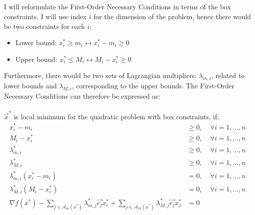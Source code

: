 \documentclass[a4paper]{article}
\begin{document}
\subsection{}
I will reformulate the First-Order Necessary Conditions in terms of the box
constraints. I will use index $i$ for the dimension of the problem, hence there
would be two constraints for each $i$:
\begin{itemize}
\item Lower bound: $x_i^* \geq m_i \leftrightarrow x_i^* - m_i \geq 0 $
\item Upper bound: $x_i^* \leq M_i \leftrightarrow M_i - x_i^*\geq 0 $
\end{itemize}
Furthermore, there would be two sets of Lagrangian multipliers: $\lambda_{m,i}$,
related to lower bounds and $\lambda_{M,i}$, corresponding to
the upper bounds. The First-Order Necessary Conditions can therefore be
expressed as: \\\\
$\vec{x}^{*}$ is local minimum for the quadratic problem with box constraints, if:
\begin{align}
  x_i^* - m_i &\geq 0 ,\; & \forall i=1, \ldots, n \\
  M_i - x_i^* &\geq 0 ,\; & \forall i=1, \ldots, n \\
  \lambda_{m,i}^{*} &\geq 0 ,\; & \forall i=1, \ldots, n \\
  \lambda_{M,i}^{*} &\geq 0 ,\; & \forall i=1, \ldots, n \\
  \lambda_{m,i}^{*}(x_i^* - m_i)& =0, \; & \forall i=1, \ldots, n\\
  \lambda_{M,i}^{*}( M_i - x_i^*) &=0, \; & \forall i=1, \ldots, n\\
  \nabla f\left(x^{*}\right)
  -
  \sum_{j \in \mathcal{A}_m\left(x^{*}\right)} \lambda_{m,j}^{*}\vec{e_j} x^{*}_i
  +
  \sum_{j \in \mathcal{A}_M\left(x^{*}\right)} \lambda_{M,j}^{*} \vec{e_j} x^{*}_j &= 0
\end{align}
\end{document}
